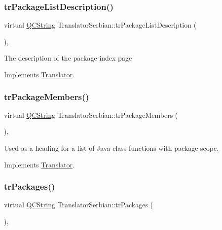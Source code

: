 \subsubsection{\texorpdfstring{trPackageListDescription()}{trPackageListDescription()}}
{\footnotesize\ttfamily virtual \mbox{\hyperlink{class_q_c_string}{Q\+C\+String}} Translator\+Serbian\+::tr\+Package\+List\+Description (\begin{DoxyParamCaption}{ }\end{DoxyParamCaption})\hspace{0.3cm}{\ttfamily [inline]}, {\ttfamily [virtual]}}

The description of the package index page 

Implements \mbox{\hyperlink{class_translator}{Translator}}.

\mbox{\label{class_translator_serbian_a351cc22f0408cf99e4f4c0f134019da1}} 
\subsubsection{\texorpdfstring{trPackageMembers()}{trPackageMembers()}}
{\footnotesize\ttfamily virtual \mbox{\hyperlink{class_q_c_string}{Q\+C\+String}} Translator\+Serbian\+::tr\+Package\+Members (\begin{DoxyParamCaption}{ }\end{DoxyParamCaption})\hspace{0.3cm}{\ttfamily [inline]}, {\ttfamily [virtual]}}

Used as a heading for a list of Java class functions with package scope. 

Implements \mbox{\hyperlink{class_translator}{Translator}}.

\mbox{\label{class_translator_serbian_a53091b5c44279573a42333bd85b73571}} 
\subsubsection{\texorpdfstring{trPackages()}{trPackages()}}
{\footnotesize\ttfamily virtual \mbox{\hyperlink{class_q_c_string}{Q\+C\+String}} Translator\+Serbian\+::tr\+Packages (\begin{DoxyParamCaption}{ }\end{DoxyParamCaption})\hspace{0.3cm}{\ttfamily [inline]}, {\ttfamily [virtual]}}

